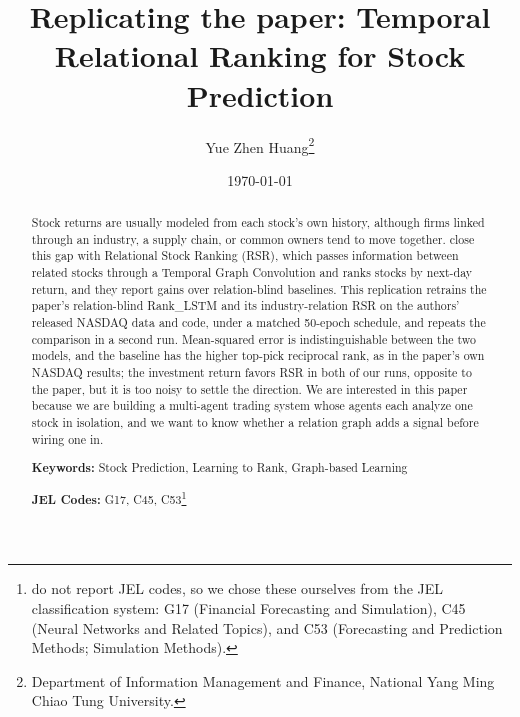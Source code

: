 \documentclass[12pt]{article}
\begin{document}
\begin{titlepage}

\title{Replicating the paper:
       Temporal Relational Ranking for Stock Prediction \citep{feng2019temporal}}

\author{Yue Zhen Huang\thanks{Department of Information Management and Finance,
        National Yang Ming Chiao Tung University.}}

\date{\today}
\maketitle

\begin{abstract}
\noindent
Stock returns are usually modeled from each stock's own history, although firms linked through
an industry, a supply chain, or common owners tend to move together.
\citet{feng2019temporal} close this gap with Relational Stock Ranking (RSR), which passes
information between related stocks through a Temporal Graph Convolution and ranks stocks by
next-day return, and they report gains over relation-blind baselines. This replication retrains
the paper's relation-blind Rank\_LSTM and its industry-relation RSR on the authors' released
NASDAQ data and code, under a matched 50-epoch schedule, and repeats the comparison in a second
run. Mean-squared error is indistinguishable between the two models, and the baseline has the
higher top-pick reciprocal rank, as in the paper's own NASDAQ results; the investment return
favors RSR in both of our runs, opposite to the paper, but it is too noisy to settle the
direction. We are interested in this paper because we are building a multi-agent trading system
whose agents each analyze one stock in isolation, and we want to know whether a relation graph
adds a signal before wiring one in.

\vspace{0in}
\noindent\textbf{Keywords:} Stock Prediction, Learning to Rank, Graph-based Learning

\vspace{0in}
\noindent\textbf{JEL Codes:} G17, C45, C53\footnote{\citet{feng2019temporal} do not report JEL
codes, so we chose these ourselves from the JEL classification system: G17 (Financial
Forecasting and Simulation), C45 (Neural Networks and Related Topics), and C53 (Forecasting and
Prediction Methods; Simulation Methods).}

\bigskip
\end{abstract}

\setcounter{page}{0}
\thispagestyle{empty}
\end{titlepage}
\pagebreak
\end{document}
